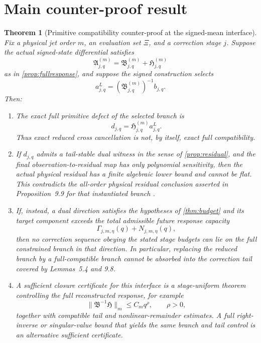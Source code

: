 \documentclass[12pt]{article}
\theoremstyle{plain}
\newtheorem{theorem}{Theorem}[section]
\theoremstyle{definition}
\theoremstyle{remark}
\newcommand{\Comp}{\mathfrak A}
\newcommand{\Red}{\mathfrak B}
\newcommand{\Hidden}{\mathfrak H}
\begin{document}
\section{Main counter-proof result}\label{sec:counterproof}
\begin{theorem}[Primitive compatibility counter-proof at the signed-mean interface]\label{thm:main}
Fix a physical jet order \(m\), an evaluation set \(\Xi\), and a correction stage \(j\). Suppose the actual signed-state differential satisfies
\[
\Comp_{j,q}^{(m)}=\Red_{j,q}^{(m)}+\Hidden_{j,q}^{(m)}
\]
as in \cref{prop:fullresponse}, and suppose the signed construction selects
\[
a^L_{j,q}=(\Red_{j,q}^{(m)})^{-1}b_{j,q}.
\]
Then:
\begin{enumerate}[label=(\alph*),leftmargin=2.2em,itemsep=0.35em]
\item The exact full primitive defect of the selected branch is
\[
\boxed{d_{j,q}=\Hidden_{j,q}^{(m)}a^L_{j,q}.}
\]
Thus exact reduced cross cancellation is not, by itself, exact full compatibility.

\item If \(d_{j,q}\) admits a tail-stable dual witness in the sense of \cref{prop:residual}, and the final observation-to-residual map has only polynomial sensitivity, then the actual physical residual has a finite algebraic lower bound and cannot be flat. This contradicts the all-order physical residual conclusion asserted in Proposition~9.9 for that instantiated branch \cite[Prop.~9.9]{OpenAI2026}.

\item If, instead, a dual direction satisfies the hypotheses of \cref{thm:budget} and its target component exceeds the total admissible future response capacity
\[
\Gamma_{j,m,\eta}(q)+N_{j,m,\eta}(q),
\]
then no correction sequence obeying the stated stage budgets can lie on the full constrained branch in that direction. In particular, replacing the reduced branch by a full-compatible branch cannot be absorbed into the correction tail covered by Lemmas~5.4 and 9.8.

\item A sufficient closure certificate for this interface is a stage-uniform theorem controlling the \emph{full} reconstructed response, for example
\[
\|\Red^{-1}\Hidden\|_m\le C_mq^\rho,\qquad \rho>0,
\]
together with compatible tail and nonlinear-remainder estimates. A full right-inverse or singular-value bound that yields the same branch and tail control is an alternative sufficient certificate.


\end{enumerate}
\end{theorem}
\end{document}
